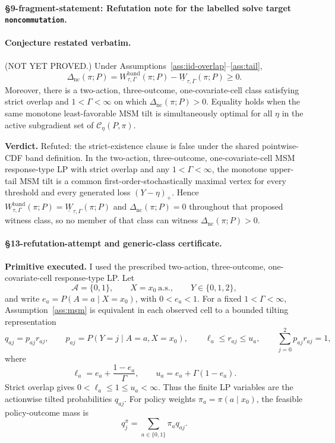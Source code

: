 
\paragraph{\S9-fragment-statement: Refutation note for the labelled solve target \texttt{noncommutation}.}\label{prop:noncommutation-refuted}
\paragraph{Conjecture restated verbatim.}\label{conj:noncommutation}
(NOT YET PROVED.)  Under Assumptions~\ref{ass:iid-overlap}--\ref{ass:tail},
\[
\Delta_{\mathrm{nc}}(\pi;P)=
W_{\tau,\Gamma}^{\mathrm{band}}(\pi;P)
-\underline W_{\tau,\Gamma}(\pi;P)\geq 0.
\]
Moreover, there is a two-action, three-outcome, one-covariate-cell class satisfying strict overlap and \(1<\Gamma<\infty\) on which \(\Delta_{\mathrm{nc}}(\pi;P)>0\).  Equality holds when the same monotone least-favorable MSM tilt is simultaneously optimal for all \(\eta\) in the active subgradient set of \(\mathcal C_\eta(P,\pi)\).

\textbf{Verdict.} Refuted: the strict-existence clause is false under the shared pointwise-CDF band definition. In the two-action, three-outcome, one-covariate-cell MSM response-type LP with strict overlap and any \(1<\Gamma<\infty\), the monotone upper-tail MSM tilt is a common first-order-stochastically maximal vertex for every threshold and every generated loss \((Y-\eta)_+\). Hence \(W_{\tau,\Gamma}^{\mathrm{band}}(\pi;P)=\underline W_{\tau,\Gamma}(\pi;P)\) and \(\Delta_{\mathrm{nc}}(\pi;P)=0\) throughout that proposed witness class, so no member of that class can witness \(\Delta_{\mathrm{nc}}(\pi;P)>0\).

\paragraph{\S13-refutation-attempt and generic-class certificate.}
\textbf{Primitive executed.}  I used the prescribed two-action, three-outcome, one-covariate-cell response-type LP.  Let
\[
\mathcal A=\{0,1\},\qquad X=x_0\ \text{a.s.},\qquad
Y\in\{0,1,2\},
\]
and write \(e_a=P(A=a\mid X=x_0)\), with \(0<e_a<1\).  For a fixed
\(1<\Gamma<\infty\), Assumption~\ref{ass:msm} is equivalent in each observed cell to a bounded
tilting representation
\[
q_{aj}=p_{aj}r_{aj},\qquad
p_{aj}=P(Y=j\mid A=a,X=x_0),\qquad
\ell_a\le r_{aj}\le u_a,\qquad
\sum_{j=0}^2 p_{aj}r_{aj}=1,
\]
where
\[
\ell_a=e_a+\frac{1-e_a}{\Gamma},\qquad
u_a=e_a+\Gamma(1-e_a).
\]
Strict overlap gives \(0<\ell_a\le1\le u_a<\infty\).  Thus the finite LP variables are the
actionwise tilted probabilities \(q_{aj}\).  For policy weights
\(\pi_a=\pi(a\mid x_0)\), the feasible policy-outcome mass is
\[
q^\pi_j=\sum_{a\in\{0,1\}}\pi_a q_{aj}.
\]

